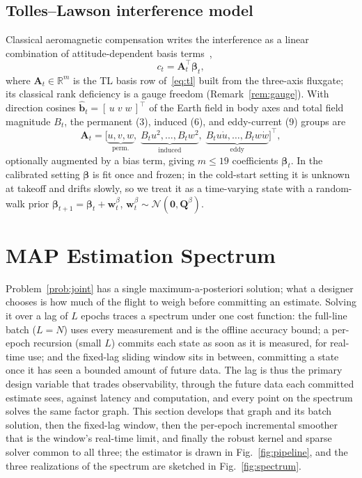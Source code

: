 \documentclass{IEEEtaes}
\begin{document}
\subsection{Tolles--Lawson interference model}
Classical aeromagnetic compensation writes the interference as a linear combination
of attitude-dependent basis terms~\cite{tolles1950,leliak1961,bickel1979},
\begin{equation}
c_t=\mathbf{A}_t^{\top}\boldsymbol{\beta}_t,
\label{eq:tl}
\end{equation}
where $\mathbf{A}_t\in\mathbb{R}^{m}$ is the TL basis row of~\eqref{eq:tl} built
from the three-axis fluxgate; its classical rank deficiency is a gauge freedom
(Remark~\ref{rem:gauge}). With direction cosines $\hat{\mathbf{b}}_t=[\,u\;v\;w\,]^{\top}$ of the
Earth field in body axes and total field magnitude $B_t$, the permanent (3),
induced (6), and eddy-current (9) groups are
\begin{equation}
\mathbf{A}_t=\big[\underbrace{u,v,w}_{\text{perm.}},\;
\underbrace{B_tu^2,\dots,B_tw^2}_{\text{induced}},\;
\underbrace{B_tu\dot u,\dots,B_tw\dot w}_{\text{eddy}}\big]^{\top},
\label{eq:tlbasis}
\end{equation}
optionally augmented by a bias term, giving $m\!\le\!19$ coefficients
$\boldsymbol{\beta}_t$. In the calibrated setting $\boldsymbol{\beta}$ is fit once
and frozen; in the cold-start setting it is unknown at takeoff and drifts slowly, so
we treat it as a time-varying state with a random-walk prior
$\boldsymbol{\beta}_{t+1}=\boldsymbol{\beta}_t+\mathbf{w}^{\beta}_t$,
$\mathbf{w}^{\beta}_t\sim\mathcal{N}(\mathbf{0},\mathbf{Q}^{\beta})$.

\section{MAP Estimation Spectrum}\label{sec:method}
Problem~\ref{prob:joint} has a single maximum-a-posteriori solution; what a designer
chooses is how much of the flight to weigh before committing an estimate. Solving it
over a lag of $L$ epochs traces a spectrum under one cost function: the full-line
batch ($L=N$) uses every measurement and is the offline accuracy bound; a per-epoch
recursion (small $L$) commits each state as soon as it is measured, for real-time
use; and the fixed-lag sliding window sits in between, committing a state once it has
seen a bounded amount of future data. The lag is thus the primary design variable that
trades observability, through the future data each committed estimate sees, against
latency and computation, and every point on the spectrum solves the same factor
graph. This section develops that graph and its batch solution, then the fixed-lag
window, then the per-epoch incremental smoother that is the window's real-time limit,
and finally the robust kernel and sparse solver common to all three; the estimator is
drawn in Fig.~\ref{fig:pipeline}, and the three realizations of the spectrum are
sketched in Fig.~\ref{fig:spectrum}.
\end{document}
